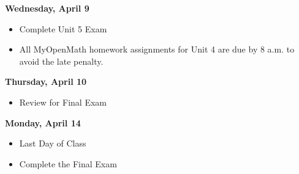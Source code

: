\documentclass[11pt]{article}
\begin{document}
\textbf{Wednesday, April 9}

\begin{itemize}
\item Complete Unit 5 Exam
\item All MyOpenMath homework assignments for Unit 4 are due by 8 a.m. to avoid the late penalty.
\end{itemize}

\textbf{Thursday, April 10}

\begin{itemize}
\item Review for Final Exam
\end{itemize}

\textbf{Monday, April 14}

\begin{itemize}
\item Last Day of Class
\item Complete the Final Exam
\end{itemize}
\end{document}
